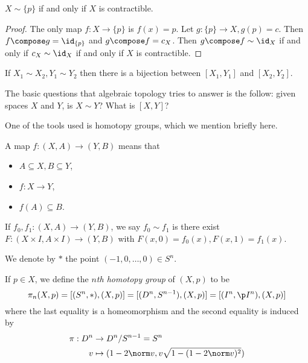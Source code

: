 \documentclass[a4paper]{article}
\renewcommand{\b}{\p}
\begin{document}
\begin{eg}
  \(X \sim \{p\}\) if and only if \(X\) is contractible.
\end{eg}

\begin{proof}
  The only map \(f: X \to \{p\}\) is \(f(x) = p\). Let \(g: \{p\} \to X, g(p) = c\). Then \(f \compose g = \id_{\{p\}}\) and \(g \compose f = c_X\). Then \(g \compose f \sim \id_X\) if and only if \(c_X \sim \id_X\) if and only if \(X\) is contractible.
\end{proof}

\begin{lemma}
  If \(X_1 \sim X_2, Y_1 \sim Y_2\) then there is a bijection between \([X_1, Y_1]\) and \([X_2, Y_2]\).
\end{lemma}

The basic questions that algebraic topology tries to answer is the follow: given spaces \(X\) and \(Y\), is \(X \sim Y\)? What is \([X, Y]\)?

One of the tools used is homotopy groups, which we mention briefly here.

\begin{definition}
  A map \(f: (X, A) \to (Y, B)\) means that
  \begin{itemize}
  \item \(A \subseteq X, B \subseteq Y\),
  \item \(f: X \to Y\),
  \item \(f(A) \subseteq B\).
  \end{itemize}
\end{definition}

If \(f_0, f_1: (X, A) \to (Y, B)\), we say \(f_0 \sim f_1\) is there exist \(F: (X \times I, A \times I) \to (Y, B)\) with \(F(x, 0) = f_0(x), F(x, 1) = f_1(x)\).

\begin{notation}
  We denote by \(*\) the point \((-1, 0, \dots, 0) \in S^n\).
\end{notation}

\begin{definition}
  If \(p \in X\), we define the \emph{\(n\)th homotopy group} of \((X, p)\) to be
  \[
    \pi_n(X, p) = [(S^n, *), (X, p)] = [(D^n, S^{n - 1}), (X, p)] = [(I^n, \b I^n), (X, p)]
  \]
  where the last equality is a homeomorphism and the second equality is induced by
  \begin{align*}
    \pi: D^n &\to D^n/S^{n -1} = S^n \\
    v &\mapsto (1 - 2 \norm v, v \sqrt{1 - (1 - 2\norm v)^2})
  \end{align*}
\end{definition}
\end{document}
